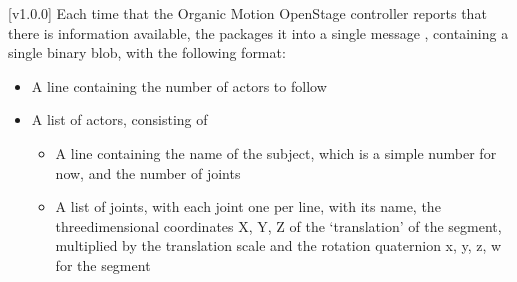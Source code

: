 [v1.0.0]
Each time that the Organic Motion OpenStage controller reports that there is information
available, the  packages it into a single message
\openSq{}\closeSq, containing a single binary blob, with the following
format:
\begin{itemize}
\item A line containing the number of actors to follow
\item\exSp{}A list of actors, consisting of
\begin{itemize}
\item A line containing the name of the subject, which is a simple number for now, and the
number of joints
\item\exSp{}A list of joints, with each joint one per line, with its name, the
three\longDash{}dimensional coordinates \openSq{}X, Y, Z\closeSq{} of the `translation'
of the segment, multiplied by the translation scale and the rotation quaternion
\openSq{}x, y, z, w\closeSq{} for the segment
\end{itemize}
\end{itemize}
\appendixEnd{}
